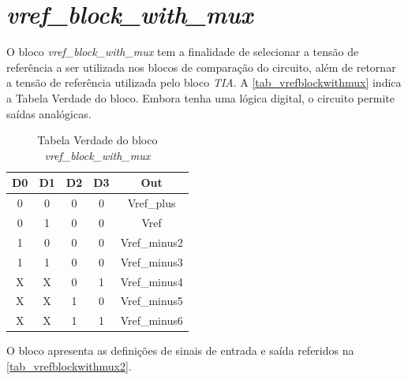 \renewcommand{\NomeBloco}{\emph{vref\_block\_with\_mux}}
\renewcommand{\NomeBlocoA}{vrefblockwithmux}
\renewcommand{\NomePTab}{tab_\NomeBlocoA}
\renewcommand{\NomeSTab}{tab_\NomeBlocoA2}
\renewcommand{\NomePFig}{fig_\NomeBlocoA}
\renewcommand{\NomeSFig}{fig_\NomeBlocoA2}
\renewcommand{\NomeTTab}{tab_\NomeBlocoA3}

\section{\NomeBloco}

O bloco \NomeBloco{} tem a finalidade de selecionar a tens\~ao de refer\^encia a ser utilizada nos blocos de compara{\c c}\~ao do circuito, al\'em de retornar a tens\~ao de refer\^encia utilizada pelo bloco \emph{TIA}. A \autoref{\NomePTab} indica a Tabela Verdade do bloco. Embora tenha uma l\'ogica digital, o circuito permite sa\'idas anal\'ogicas.

\begin{table}[htbp]

\caption{Tabela Verdade do bloco \NomeBloco}%
\label{\NomePTab}
\centering
\begin{tabular}{ccccc}
    \toprule
    D0 & D1 & D2 & D3 & Out \\
    \midrule \midrule
    0 & 0 & 0 & 0 & Vref\_plus\\
    \midrule
    0 & 1 & 0 & 0 & Vref\\
    \midrule
    1 & 0 & 0 & 0 & Vref\_minus2\\
    \midrule
    1 & 1 & 0 & 0 & Vref\_minus3\\
    \midrule
    X & X & 0 & 1 & Vref\_minus4\\
    \midrule
    X & X & 1 & 0 & Vref\_minus5\\
    \midrule
    X & X & 1 & 1 & Vref\_minus6\\
\bottomrule

\end{tabular}
\end{table}

O bloco apresenta as defini{\c c}\~oes de sinais de entrada e sa\'ida referidos na \autoref{\NomeSTab}.

